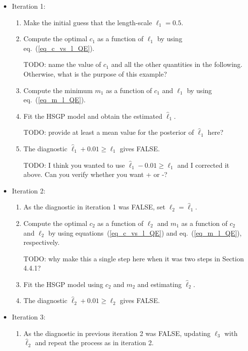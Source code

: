 \begin{itemize}
\item[] Iteration 1:
	\begin{enumerate}
	\item Make the initial guess that the length-scale $\ell_1=0.5$.
	
	\item Compute the optimal $c_1$ as a function of $\ell_1$ by using eq.~(\ref{eq_c_vs_l_QE}).
	
	TODO: name the value of $c_1$ and all the other quantities in the following. Otherwise, what is the purpose of this example?
	
	\item Compute the minimum $m_1$ as a function of $c_1$ and $\ell_1$ by using eq.~(\ref{eq_m_l_QE}).
	
	\item Fit the HSGP model and obtain the estimated $\hat{\ell}_1$.
	
	TODO: provide at least a mean value for the posterior of  $\hat{\ell}_1$ here?
	
	\item The diagnostic $\hat{\ell}_1 + 0.01 \geq \ell_1$ gives FALSE.
	
	TODO: I think you wanted to use $\hat{\ell}_1 - 0.01 \geq \ell_1$ and I corrected it above. Can you verify whether you want + or -?
	\end{enumerate}
	
\item[] Iteration 2:
	\begin{enumerate}
	\item As the diagnostic in iteration 1 was FALSE, set $\ell_2 = \hat{\ell}_1$.
	
	\item Compute the optimal $c_2$ as a function of $\ell_2$ and $m_1$ as a function of $c_2$ and $\ell_2$ by using equations~(\ref{eq_c_vs_l_QE}) and eq.~(\ref{eq_m_l_QE}), respectively.
	
	TODO: why make this a single step here when it was two steps in Section 4.4.1?
	
	\item Fit the HSGP model using $c_2$ and $m_2$ and estimating $\hat{\ell}_2$.
	
	\item The diagnostic $\hat{\ell}_2 + 0.01 \geq \ell_2$ gives FALSE.
	\end{enumerate}
	
\item[] Iteration 3:
	\begin{enumerate}
	\item As the diagnostic in previous iteration 2 was FALSE, updating $\ell_3$ with $\hat{\ell}_2$ and repeat the process as in iteration 2.
	

\end{enumerate}
\end{itemize}
